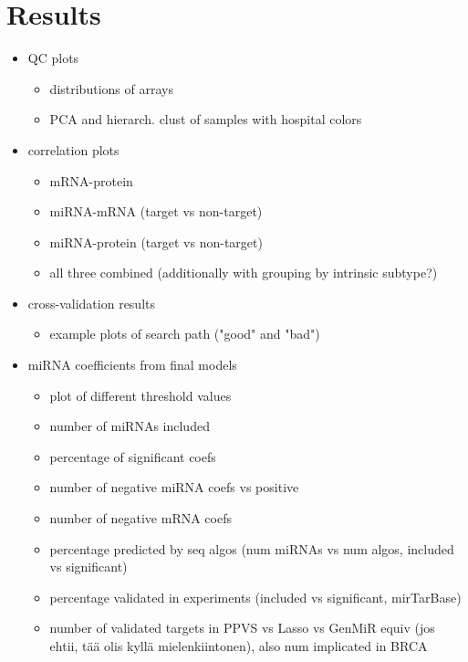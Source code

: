 
\section{Results}

\begin{itemize}
  \item QC plots
  \begin{itemize}
    \item distributions of arrays
    \item PCA and hierarch. clust of samples with hospital colors
  \end{itemize}
  \item correlation plots
  \begin{itemize}
    \item mRNA-protein
    \item miRNA-mRNA (target vs non-target)
    \item miRNA-protein (target vs non-target)
    \item all three combined (additionally with grouping by intrinsic subtype?)
  \end{itemize}
  \item cross-validation results
  \begin{itemize}
    \item example plots of search path ("good" and "bad")
  \end{itemize}
  \item miRNA coefficients from final models
  \begin{itemize}
  	\item plot of different threshold values
    \item number of miRNAs included
    \item percentage of significant coefs
    \item number of negative miRNA coefs vs positive
    \item number of negative mRNA coefs
    \item percentage predicted by seq algos (num miRNAs vs num algos, included vs significant)
    \item percentage validated in experiments (included vs significant, mirTarBase)
    \item number of validated targets in PPVS vs Lasso vs GenMiR equiv (jos ehtii, tää olis kyllä mielenkiintonen), also num implicated in BRCA

\end{itemize}
\end{itemize}
